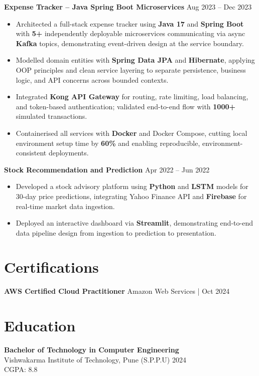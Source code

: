 \documentclass[a4paper,10pt]{article}
\begin{document}
\textbf{Expense Tracker -- Java Spring Boot Microservices} \hfill Aug 2023 -- Dec 2023
\begin{itemize}[leftmargin=*]
    \item Architected a full-stack expense tracker using \textbf{Java 17} and \textbf{Spring Boot} with \textbf{5+} independently deployable microservices communicating via async \textbf{Kafka} topics, demonstrating event-driven design at the service boundary.
    \item Modelled domain entities with \textbf{Spring Data JPA} and \textbf{Hibernate}, applying OOP principles and clean service layering to separate persistence, business logic, and API concerns across bounded contexts.
    \item Integrated \textbf{Kong API Gateway} for routing, rate limiting, load balancing, and token-based authentication; validated end-to-end flow with \textbf{1000+} simulated transactions.
    \item Containerised all services with \textbf{Docker} and Docker Compose, cutting local environment setup time by \textbf{60\%} and enabling reproducible, environment-consistent deployments.
\end{itemize}

\textbf{Stock Recommendation and Prediction} \hfill Apr 2022 -- Jun 2022
\begin{itemize}[leftmargin=*]
    \item Developed a stock advisory platform using \textbf{Python} and \textbf{LSTM} models for 30-day price predictions, integrating Yahoo Finance API and \textbf{Firebase} for real-time market data ingestion.
    \item Deployed an interactive dashboard via \textbf{Streamlit}, demonstrating end-to-end data pipeline design from ingestion to prediction to presentation.
\end{itemize}

\section*{Certifications}
\textbf{AWS Certified Cloud Practitioner} \hfill Amazon Web Services \;|\; Oct 2024

\section*{Education}

\textbf{Bachelor of Technology in Computer Engineering} \\
Vishwakarma Institute of Technology, Pune (S.P.P.U) \hfill 2024 \\
CGPA: 8.8
\end{document}
